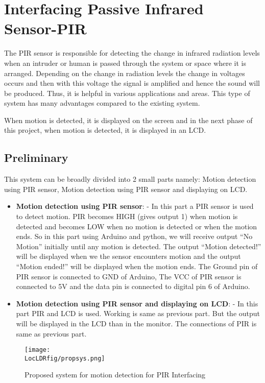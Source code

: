 \chapter {Interfacing Passive Infrared Sensor-PIR}
\thispagestyle{empty}
\label{ldr}

\newcommand{\LocLDRfig}{\Origin/user-code/pir/figures}
\newcommand{\LocLDRardcode}{\Origin/user-code/pir/arduino}
\newcommand{\LocLDRardbrief}[1]{{\tt
      \seqsplit{Origin/user-code/pir/arduino/#1}},
  see \fnrefp{fn:file-loc}}

\newcommand{\LocLDRpycode}{\Origin/user-code/pir/python}
\newcommand{\LocLDRpybrief}[1]{{\tt \seqsplit{%
        Origin/user-code/pir/python/#1}}, see \fnrefp{fn:file-loc}}



The PIR sensor is responsible for detecting the change in infrared radiation levels when an intruder or human is passed through the system or space where it is arranged. Depending on the change in radiation levels the change in voltages occurs and then with this voltage the signal is amplified and hence the sound will be produced. Thus, it is helpful in various applications and areas. This type of system has many advantages compared to the existing system. 

When motion is detected, it is displayed on the screen and in the next phase of this project, when motion is detected, it is displayed in an LCD. 

\section{Preliminary}
This system can be broadly divided into 2 small parts namely:  Motion detection using PIR sensor, Motion detection using PIR sensor and displaying on LCD.
\begin{itemize}
  \item \textbf{Motion detection using PIR sensor}: - In this part a PIR sensor is used to detect motion. PIR becomes HIGH (gives output 1) when motion is detected and becomes LOW when no motion is detected or when the motion ends.
So in this part using Arduino and python, we will receive output “No Motion” initially until any motion is detected. The output “Motion detected!” will be displayed when we the sensor encounters motion and the output “Motion ended!” will be displayed when the motion ends. The Ground pin of PIR sensor is connected to GND of Arduino, The VCC of PIR sensor is connected to 5V and the data pin is connected to digital pin 6 of Arduino.

  \item \textbf{Motion detection using PIR sensor and displaying on LCD}: - In this part PIR and LCD is used. Working is same as previous part. But the output will be displayed in the LCD than in the monitor. The connections of PIR is same as previous part. 
\end{itemize}
\begin{figure}[hpt]
  \centering
    \texttt{[image: \\LocLDRfig/propsys.png]}
    \label{fig:propsys} \hfill
  \caption{Proposed system for motion detection for PIR Interfacing}
\end{figure} 

